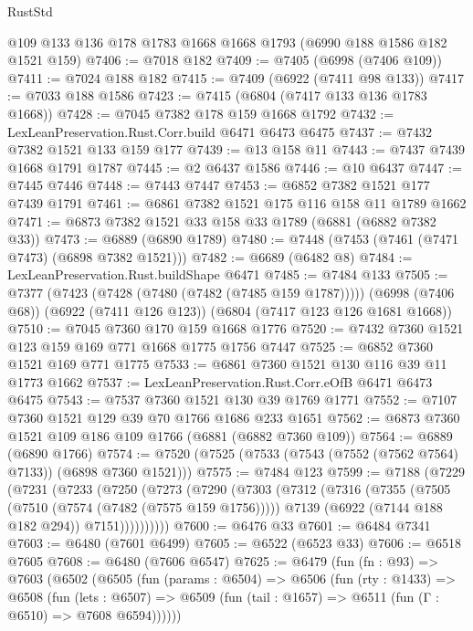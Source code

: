 \begin{lexlean}{RustStd}
\begin{coremodule}
    @109
    @133
    @136
    @178
    @1783
    @1668
    @1668
    @1793
    (@6990 @188 @1586 @182 @1521 @159)
@7406 := @7018 @182
@7409 := @7405 (@6998 (@7406 @109))
@7411 := @7024 @188 @182
@7415 := @7409 (@6922 (@7411 @98 @133))
@7417 := @7033 @188 @1586
@7423 := @7415 (@6804 (@7417 @133 @136 @1783 @1668))
@7428 := @7045 @7382 @178 @159 @1668 @1792
@7432 := LexLeanPreservation.Rust.Corr.build @6471 @6473 @6475
@7437 := @7432 @7382 @1521 @133 @159 @177
@7439 := @13 @158 @11
@7443 := @7437 @7439 @1668 @1791 @1787
@7445 := @2 @6437 @1586
@7446 := @10 @6437
@7447 := @7445 @7446
@7448 := @7443 @7447
@7453 := @6852 @7382 @1521 @177 @7439 @1791
@7461 := @6861 @7382 @1521 @175 @116 @158 @11 @1789 @1662
@7471 := @6873 @7382 @1521 @33 @158 @33 @1789 (@6881 (@6882 @7382 @33))
@7473 := @6889 (@6890 @1789)
@7480 := @7448 (@7453 (@7461 (@7471 @7473) (@6898 @7382 @1521)))
@7482 := @6689 (@6482 @8)
@7484 := LexLeanPreservation.Rust.buildShape @6471
@7485 := @7484 @133
@7505 := @7377
    (@7423 (@7428 (@7480 (@7482 (@7485 @159 @1787)))))
    (@6998 (@7406 @68))
    (@6922 (@7411 @126 @123))
    (@6804 (@7417 @123 @126 @1681 @1668))
@7510 := @7045 @7360 @170 @159 @1668 @1776
@7520 := @7432 @7360 @1521 @123 @159 @169 @771 @1668 @1775 @1756 @7447
@7525 := @6852 @7360 @1521 @169 @771 @1775
@7533 := @6861 @7360 @1521 @130 @116 @39 @11 @1773 @1662
@7537 := LexLeanPreservation.Rust.Corr.eOfB @6471 @6473 @6475
@7543 := @7537 @7360 @1521 @130 @39 @1769 @1771
@7552 := @7107 @7360 @1521 @129 @39 @70 @1766 @1686 @233 @1651
@7562 := @6873 @7360 @1521 @109 @186 @109 @1766 (@6881 (@6882 @7360 @109))
@7564 := @6889 (@6890 @1766)
@7574 := @7520 (@7525 (@7533 (@7543 (@7552 (@7562 @7564) @7133)) (@6898 @7360 @1521)))
@7575 := @7484 @123
@7599 := @7188
    (@7229
      (@7231
        (@7233
          (@7250
            (@7273
              (@7290
                (@7303
                  (@7312
                    (@7316
                      (@7355
                        (@7505 (@7510 (@7574 (@7482 (@7575 @159 @1756)))))
                        @7139
                        (@6922 (@7144 @188 @182 @294))
                        @7151))))))))))
@7600 := @6476 @33
@7601 := @6484 @7341
@7603 := @6480 (@7601 @6499)
@7605 := @6522 (@6523 @33)
@7606 := @6518 @7605
@7608 := @6480 (@7606 @6547)
@7625 := @6479
    (fun (fn : @93) =>
    @7603
      (@6502
        (@6505
          (fun (params : @6504) =>
          @6506
            (fun (rty : @1433) =>
            @6508
              (fun (lets : @6507) =>
              @6509 (fun (tail : @1657) => @6511 (fun (Γ : @6510) => @7608 @6594))))))

\end{coremodule}
\end{lexlean}
